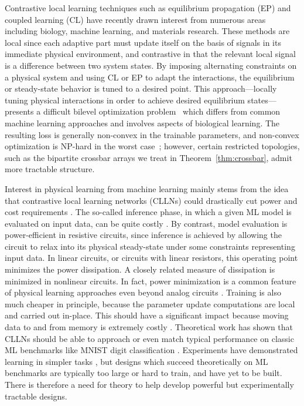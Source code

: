\documentclass[final, 11pt, nonatbib]{elsarticle}
\theoremstyle{definition}
\theoremstyle{plain}
\numberwithin{equation}{section}
\begin{document}
Contrastive local learning techniques such as equilibrium propagation (EP)  \cite{scellier2017equilibrium} and coupled learning (CL)  \cite{stern2021learning} have recently drawn interest from numerous areas including biology, machine learning, and materials research. These methods are local since each adaptive part must update itself on the basis of signals in its immediate physical environment, and contrastive in that the relevant local signal is a difference between two system states. By imposing alternating constraints on a physical system and using CL or EP to adapt the interactions, the equilibrium or steady-state behavior is tuned to a desired point. This approach---locally tuning physical interactions in order to achieve desired equilibrium states---presents a difficult bilevel optimization problem~\cite{colson2007bilevel} which differs from common machine learning approaches and involves aspects of biological learning. The resulting loss is generally non-convex in the trainable parameters, and non-convex optimization is NP-hard in the worst case~\cite{murtyKabadi1987}; however, certain restricted topologies, such as the bipartite crossbar arrays we treat in Theorem~\ref{thm:crossbar}, admit more tractable structure.

Interest in physical learning from machine learning mainly stems from the idea that contrastive local learning networks (CLLNs) could drastically cut power and cost requirements \cite{christensen2022RoadmapNeuromorphic2022, dillavouMachineLearningProcessor2024}. The so-called inference phase, in which a given ML model is evaluated on input data, can be quite costly \cite{strubellEnergyPolicyConsiderations2019, luccioniPowerHungryProcessing2024}. By contrast, model evaluation is power-efficient in resistive circuits, since inference is achieved by allowing the circuit to relax into its physical steady-state under some constraints representing input data. In linear circuits, or circuits with linear resistors, this operating point minimizes the power dissipation. A closely related measure of dissipation is minimized in nonlinear circuits. In fact, power minimization is a common feature of physical learning approaches even beyond analog circuits \cite{vadlamaniPhysicsSuccessfullyImplements2020,stern2023learning}. Training is also much cheaper in principle, because the parameter update computations are local and carried out in-place. This should have a significant impact because moving data to and from memory is extremely costly \cite{strubellEnergyPolicyConsiderations2019}. Theoretical work has shown that CLLNs should be able to approach or even match typical performance on classic ML benchmarks like MNIST digit classification \cite{scellierUniversalApproximationTheorem2025}. Experiments have demonstrated learning in simpler tasks \cite{dillavou2022demonstration, dillavouMachineLearningProcessor2024}, but designs which succeed theoretically on ML benchmarks are typically too large or hard to train, and have yet to be built. There is therefore a need for theory to help develop powerful but experimentally tractable designs. 
\end{document}
